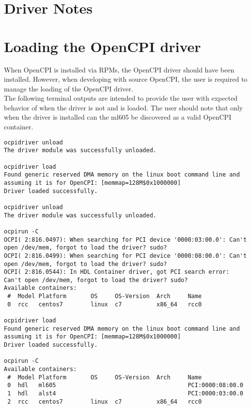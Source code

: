 \documentclass{article}
\begin{document}


\section{Driver Notes}


\section{Loading the OpenCPI driver}
When OpenCPI is installed via RPMs, the OpenCPI driver should have been installed. However, when developing with source OpenCPI, the user is required to manage the loading of the OpenCPI driver. \\
The following terminal outputs are intended to provide the user with expected behavior of when the driver is not and is loaded. The user should note that only when the driver is installed can the ml605 be discovered as a valid OpenCPI container.

\begin{lstlisting}
ocpidriver unload
The driver module was successfully unloaded.

ocpidriver load
Found generic reserved DMA memory on the linux boot command line and assuming it is for OpenCPI: [memmap=128M$0x1000000]
Driver loaded successfully.

ocpidriver unload
The driver module was successfully unloaded.

ocpirun -C
OCPI( 2:816.0497): When searching for PCI device '0000:03:00.0': Can't open /dev/mem, forgot to load the driver? sudo?
OCPI( 2:816.0499): When searching for PCI device '0000:08:00.0': Can't open /dev/mem, forgot to load the driver? sudo?
OCPI( 2:816.0544): In HDL Container driver, got PCI search error: Can't open /dev/mem, forgot to load the driver? sudo?
Available containers:
 #  Model Platform       OS     OS-Version  Arch     Name
 0  rcc   centos7        linux  c7          x86_64   rcc0
 
ocpidriver load
Found generic reserved DMA memory on the linux boot command line and assuming it is for OpenCPI: [memmap=128M$0x1000000]
Driver loaded successfully.

ocpirun -C
Available containers:
 #  Model Platform       OS     OS-Version  Arch     Name
 0  hdl   ml605                                      PCI:0000:08:00.0
 1  hdl   alst4                                      PCI:0000:03:00.0
 2  rcc   centos7        linux  c7          x86_64   rcc0
\end{lstlisting}
\end{document}
